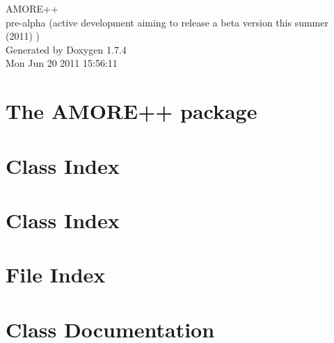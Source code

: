 \documentclass[a4paper]{book}
\begin{document}
\hypersetup{pageanchor=false}
\begin{titlepage}
\vspace*{7cm}
\begin{center}
{\Large AMORE++ \\[1ex]\large pre-\/alpha (active development aiming to release a beta version this summer (2011) ) }\\
\vspace*{1cm}
{\large Generated by Doxygen 1.7.4}\\
\vspace*{0.5cm}
{\small Mon Jun 20 2011 15:56:11}\\
\end{center}
\end{titlepage}
\clearemptydoublepage
{}
\tableofcontents
\clearemptydoublepage
{}
\hypersetup{pageanchor=true}
\chapter{The AMORE++ package}
\label{index}\hypertarget{index}{}
\chapter{Class Index}

\chapter{Class Index}

\chapter{File Index}

\chapter{Class Documentation}
























\end{document}
